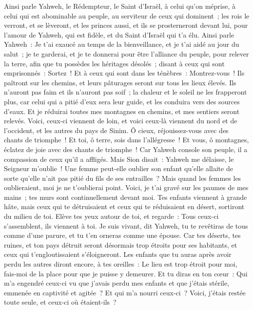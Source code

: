 \begin{multicols}{2}
Ainsi parle Yahweh, le Rédempteur, le Saint d'Israël, à celui qu'on méprise, à celui qui est abominable au peuple, au serviteur de ceux qui dominent~; les rois le verront, et se lèveront, et les princes aussi, et ils se prosterneront devant lui, pour l'amour de Yahweh, qui est fidèle, et du Saint d'Israël qui t'a élu.
Ainsi parle Yahweh~: Je t'ai exaucé au temps de la bienveillance, et je t'ai aidé au jour du salut~; je te garderai, et je te donnerai pour être l'alliance du peuple, pour relever la terre, afin que tu possèdes les héritages désolés~;
disant à ceux qui sont emprisonnés~: Sortez~! Et à ceux qui sont dans les ténèbres~: Montrez-vous~! Ils paîtront sur les chemins, et leurs pâturages seront sur tous les lieux élevés.
Ils n'auront pas faim et ils n'auront pas soif~; la chaleur et le soleil ne les frapperont plus, car celui qui a pitié d'eux sera leur guide, et les conduira vers des sources d'eaux.
Et je réduirai toutes mes montagnes en chemins, et mes sentiers seront relevés.
Voici, ceux-ci viennent de loin, et voici ceux-là viennent du nord et de l'occident, et les autres du pays de Sinim.
Ô cieux, réjouissez-vous avec des chants de triomphe~! Et toi, ô terre, sois dans l'allégresse~! Et vous, ô montagnes, éclatez de joie avec des chants de triomphe~! Car Yahweh console son peuple, il a compassion de ceux qu'il a affligés.
Mais Sion disait~: Yahweh me délaisse, le Seigneur m'oublie~!
Une femme peut-elle oublier son enfant qu'elle allaite de sorte qu'elle n'ait pas pitié du fils de ses entrailles~? Mais quand les femmes les oublieraient, moi je ne t'oublierai point.
Voici, je t'ai gravé sur les paumes de mes mains~; tes murs sont continuellement devant moi.
Tes enfants viennent à grande hâte, mais ceux qui te détruisaient et ceux qui te réduisaient en désert, sortiront du milieu de toi.
Elève tes yeux autour de toi, et regarde~: Tous ceux-ci s'assemblent, ils viennent à toi. Je suis vivant, dit Yahweh, tu te revêtiras de tous comme d'une parure, et tu t'en orneras comme une épouse.
Car tes déserts, tes ruines, et ton pays détruit seront désormais trop étroits pour ses habitants, et ceux qui t'engloutissaient s'éloigneront.
Les enfants que tu auras après avoir perdu les autres diront encore, à tes oreilles~: Le lieu est trop étroit pour moi, fais-moi de la place pour que je puisse y demeurer.
Et tu diras en ton cœur~: Qui m'a engendré ceux-ci vu que j'avais perdu mes enfants et que j'étais stérile, emmenée en captivité et agitée~? Et qui m'a nourri ceux-ci~? Voici, j'étais restée toute seule, et ceux-ci où étaient-ils~?

\end{multicols}
